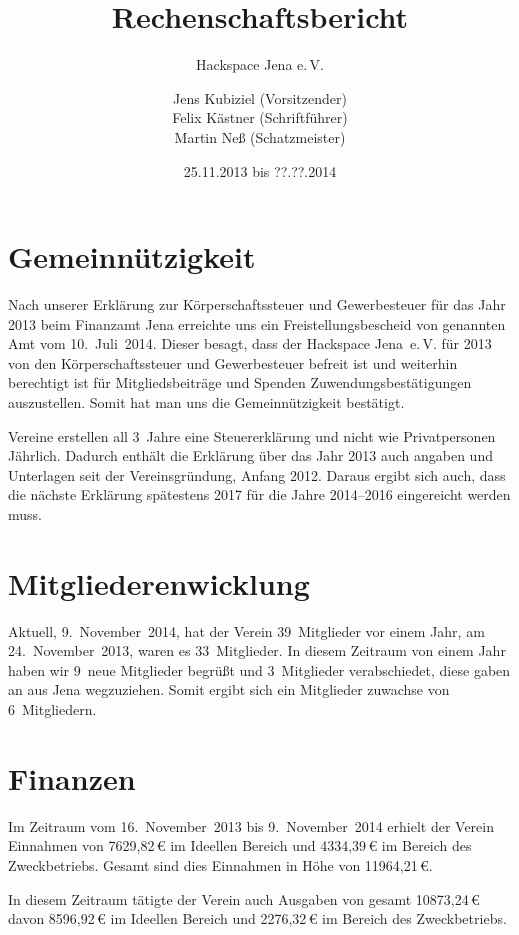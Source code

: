 \documentclass[10pt,DIV16]{scrartcl}
\title{Rechenschaftsbericht}
\subtitle{Hackspace Jena e.\,V.}
\author{%
	Jens Kubiziel (Vorsitzender)\\
    Felix Kästner (Schriftführer)\\
	Martin Neß (Schatzmeister)
}
\date{25.11.2013 bis ??.??.2014}
\begin{document}
\maketitle{}

\tableofcontents{}

\newpage{}

\section{Gemeinnützigkeit}

Nach unserer Erklärung zur Körperschaftssteuer und Gewerbesteuer für das Jahr 2013 beim Finanzamt Jena
erreichte uns ein Freistellungsbescheid von genannten Amt vom 10.~Juli~2014.
Dieser besagt, dass der Hackspace Jena~e.\,V. für 2013 von den Körperschaftssteuer und Gewerbesteuer befreit ist und weiterhin berechtigt ist für Mitgliedsbeiträge und Spenden Zuwendungsbestätigungen auszustellen.
Somit hat man uns die Gemeinnützigkeit bestätigt.

Vereine erstellen all 3~Jahre eine Steuererklärung und nicht wie Privatpersonen Jährlich.
Dadurch enthält die Erklärung über das Jahr 2013 auch angaben und Unterlagen seit der Vereinsgründung, Anfang 2012.
Daraus ergibt sich auch, dass die nächste Erklärung spätestens 2017 für die Jahre 2014--2016 eingereicht werden muss.

\section{Mitgliederenwicklung}

Aktuell, 9.~November~2014, hat der Verein 39~Mitglieder vor einem Jahr, am 24.~November~2013, waren es 33~Mitglieder.
In diesem Zeitraum von einem Jahr haben wir 9~neue Mitglieder begrüßt und 3~Mitglieder verabschiedet, diese gaben an aus Jena wegzuziehen.
Somit ergibt sich ein Mitglieder zuwachse von 6~Mitgliedern.

\section{Finanzen}

Im Zeitraum vom 16.~November~2013 bis 9.~November~2014 erhielt der Verein Einnahmen von 7629,82\,\euro{} im Ideellen Bereich und 4334,39\,\euro{} im Bereich des Zweckbetriebs.
Gesamt sind dies Einnahmen in Höhe von 11964,21\,\euro{}.

In diesem Zeitraum tätigte der Verein auch Ausgaben von gesamt 10873,24\,\euro{} davon 8596,92\,\euro{} im Ideellen Bereich und 2276,32\,\euro{} im Bereich des Zweckbetriebs.
\end{document}
